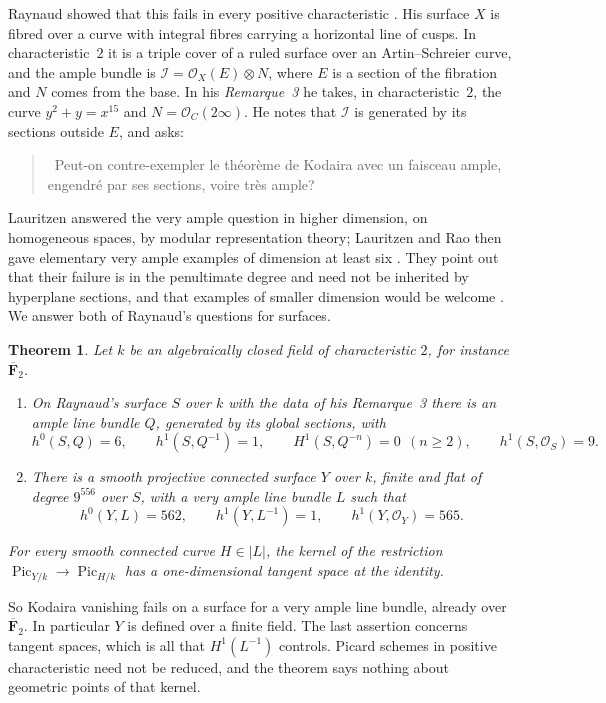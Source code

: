 \documentclass[11pt,a4paper]{article}
\theoremstyle{plain}
\newtheorem{theorem}{Theorem}
\theoremstyle{remark}
\newcommand{\OO}{\mathcal O}
\newcommand{\F}{\mathbf F}
\newcommand{\Pic}{\operatorname{Pic}}
\begin{document}
Raynaud showed that this fails in every positive characteristic \cite[p.~273]{Raynaud}. His surface $X$ is fibred over a
curve with integral fibres carrying a horizontal line of cusps. In characteristic~$2$ it is a triple cover of a ruled
surface over an Artin--Schreier curve, and the ample bundle is $\mathcal I=\OO_X(E)\otimes N$, where $E$ is a section of
the fibration and $N$ comes from the base. In his \emph{Remarque~3} \cite[p.~278]{Raynaud} he takes, in
characteristic~$2$, the curve $y^2+y=x^{15}$ and $N=\OO_C(2\infty)$. He notes that $\mathcal I$ is generated by its
sections outside $E$, and asks:
\begin{quote}
\guillemotleft\ Peut-on contre-exempler le th\'eor\`eme de Kodaira avec un faisceau ample, engendr\'e par ses
sections, voire tr\`es ample?\ \guillemotright
\end{quote}
Lauritzen answered the very ample question in higher dimension, on homogeneous spaces, by modular representation
theory; Lauritzen and Rao then gave elementary very ample examples of dimension at least six
\cite[pp.~1--2]{LauritzenRao}\cite{Lauritzen}. They point out that their failure is in the penultimate degree and need
not be inherited by hyperplane sections, and that examples of smaller dimension would be welcome
\cite[p.~2]{LauritzenRao}. We answer both of Raynaud's questions for surfaces.

\begin{theorem}\label{thm:main}
Let $k$ be an algebraically closed field of characteristic $2$, for instance $\overline{\F}_2$.
\begin{enumerate}
\item[\textup{(a)}] On Raynaud's surface $S$ over $k$ with the data of his Remarque~3 there is an ample line bundle $Q$,
generated by its global sections, with
\[
 h^0(S,Q)=6,\qquad h^1(S,Q^{-1})=1,\qquad H^1(S,Q^{-n})=0\ \ (n\ge2),\qquad h^1(S,\OO_S)=9 .
\]
\item[\textup{(b)}] There is a smooth projective connected surface $Y$ over $k$, finite and flat of degree $9^{556}$ over
$S$, with a very ample line bundle $L$ such that
\[
 h^0(Y,L)=562,\qquad h^1(Y,L^{-1})=1,\qquad h^1(Y,\OO_Y)=565 .
\]
\end{enumerate}
For every smooth connected curve $H\in|L|$, the kernel of the restriction $\Pic_{Y/k}\to\Pic_{H/k}$ has a
one-dimensional tangent space at the identity.
\end{theorem}

So Kodaira vanishing fails on a surface for a very ample line bundle, already over $\overline{\F}_2$. In particular
$Y$ is defined over a finite field. The last assertion concerns tangent spaces, which is all that $H^1(L^{-1})$
controls. Picard schemes in positive characteristic need not be reduced, and the theorem says nothing about geometric
points of that kernel.
\end{document}
